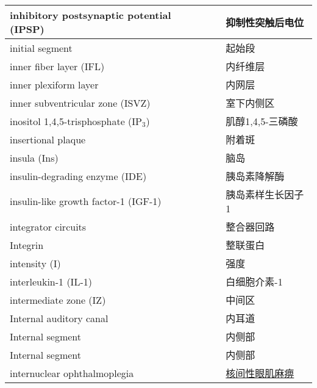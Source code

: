 \begin{longtable}{lll}
	\midrule
	inhibitory postsynaptic potential (IPSP)  && 抑制性突触后电位  \\
	
	\midrule
	initial segment && 起始段  \\
	
	\midrule
	inner fiber layer (IFL)   && 内纤维层  \\
	
	\midrule
	inner plexiform layer   && 内网层  \\
	
	\midrule
	inner subventricular zone (ISVZ)   && 室下内侧区  \\
	
	\midrule
	inositol 1,4,5-trisphosphate  (IP$_3$) && 肌醇1,4,5-三磷酸  \\
	
	\midrule
	insertional plaque   && 附着斑  \\
	
	\midrule
	insula (Ins)   && 脑岛  \\
	
	\midrule
	insulin-degrading enzyme (IDE)   && 胰岛素降解酶  \\
	
	\midrule
	insulin-like growth factor-1 (IGF-1)   && 胰岛素样生长因子1  \\
	
	\midrule
	integrator circuits  && 整合器回路  \\
	
	\midrule
	Integrin  && 整联蛋白  \\
	
	\midrule
	intensity (I)  && 强度  \\
	
	\midrule
	interleukin-1 (IL-1) && 白细胞介素-1  \\
	
	\midrule
	intermediate zone (IZ)  && 中间区  \\
	
	\midrule
	Internal auditory canal   && 内耳道  \\
	
	\midrule
	Internal segment  && 内侧部  \\
	
	\midrule
	Internal segment  && 内侧部  \\
	
	\midrule
	internuclear ophthalmoplegia  && \href{https://chuangshi.qq.com/read/27611642/12}{核间性眼肌麻痹}  \\
	

\end{longtable}
